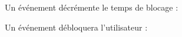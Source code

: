 \documentclass{article}
\begin{document}
\begin{enumerate}
\begin{enumerate}
\begin{enumerate}
        \vspace{0.4cm}
        \hspace*{-1.05in}
               \noindent{}
        
        
        
        
        
         Un événement décrémente le temps de blocage :
        
        \vspace{0.4cm}
        \hspace*{-1.05in}
               \noindent{}
        
        Un événement débloquera l'utilisateur :
        

\end{enumerate}
\end{enumerate}
\end{enumerate}
\end{document}

